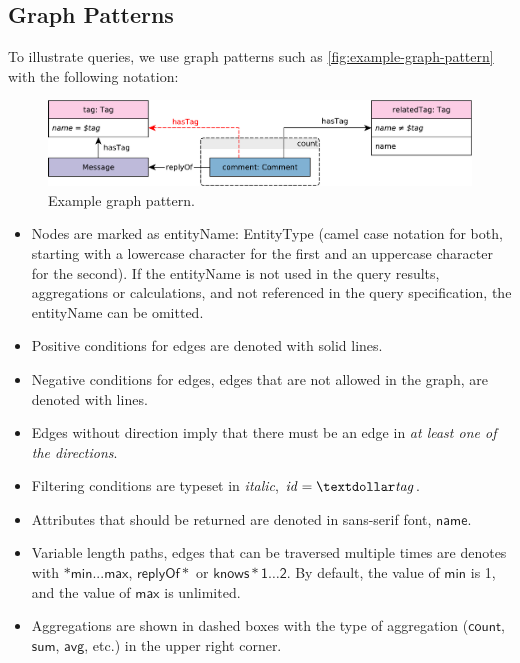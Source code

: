 
\subsection{Graph Patterns}

To illustrate queries, we use graph patterns such as \autoref{fig:example-graph-pattern} with the following notation:

\begin{figure}[ht]
	\begin{center}
		\includegraphics[scale=\patternscale,margin=0cm .2cm]{patterns/bi-read-08}
		\caption{Example graph pattern.}
		\label{fig:example-graph-pattern}
	\end{center}
\end{figure}

\begin{itemize}
	\item Nodes are marked as \textsf{entityName: EntityType} (camel case notation for both, starting with a lowercase character for the first and an uppercase character for the second). If the \textsf{entityName} is not used in the query results, aggregations or calculations, and not referenced in the query specification, the \textsf{entityName} can be omitted.
	\item Positive conditions for edges are denoted with solid lines.
	\item Negative conditions for edges, \ie edges that are not allowed in the graph, are denoted with \textcolor{red}{} lines.
	\item Edges without direction imply that there must be an edge in \emph{at least one of the directions}.
	\item Filtering conditions are typeset in \textit{italic}, \eg $\mathit{id} = \mathit{\textdollar tag}$.
	\item Attributes that should be returned are denoted in sans-serif font, \eg $\mathsf{name}$.
	\item Variable length paths, \ie edges that can be traversed multiple times are denotes with $*\mathsf{min}...\mathsf{max}$, \eg $\mathsf{replyOf}*$ or $\mathsf{knows*1 \ldots 2}$. By default, the value of $\mathsf{min}$ is 1, and the value of $\mathsf{max}$ is unlimited.
	\item Aggregations are shown in dashed boxes with the type of aggregation ($\mathsf{count}$, $\mathsf{sum}$, $\mathsf{avg}$, etc.) in the upper right corner.
\end{itemize}

